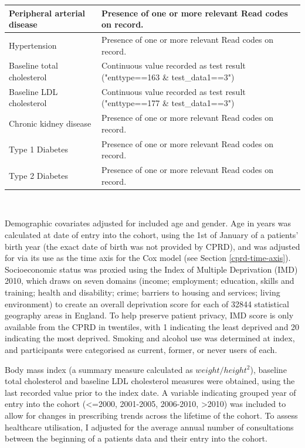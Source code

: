 \documentclass[a4paper, twoside]{templates/ociamthesis}
\begin{document}
\begin{table}[H]
\begin{tabular}[t]{>{\raggedright\arraybackslash}p{15em}>{\centering\arraybackslash}p{25em}}
\midrule
Peripheral arterial disease & Presence of one or more relevant Read codes on record.\\
\midrule
\addlinespace
Hypertension & Presence of one or more relevant Read codes on record.\\
\midrule
Baseline total cholesterol & Continuous value recorded as test result ("enttype==163 \& test\_data1==3")\\
\midrule
Baseline LDL cholesterol & Continuous value recorded as test result ("enttype==177 \& test\_data1==3")\\
\midrule
Chronic kidney disease & Presence of one or more relevant Read codes on record.\\
\midrule
Type 1 Diabetes & Presence of one or more relevant Read codes on record.\\
\midrule
\addlinespace
Type 2 Diabetes & Presence of one or more relevant Read codes on record.\\
\bottomrule
\end{tabular}
\end{table}

~

Demographic covariates adjusted for included age and gender. Age in years was calculated at date of entry into the cohort, using the 1st of January of a patients' birth year (the exact date of birth was not provided by CPRD), and was adjusted for via its use as the time axis for the Cox model (see Section \ref{cprd-time-axis}). Socioeconomic status was proxied using the Index of Multiple Deprivation (IMD) 2010, which draws on seven domains (income; employment; education, skills and training; health and disability; crime; barriers to housing and services; living environment) to create an overall deprivation score for each of 32844 statistical geography areas in England. To help preserve patient privacy, IMD score is only available from the CPRD in twentiles, with 1 indicating the least deprived and 20 indicating the most deprived. Smoking and alcohol use was determined at index, and participants were categorised as current, former, or never users of each.

Body mass index (a summary measure calculated as \(weight/height^2\)), baseline total cholesterol and baseline LDL cholesterol measures were obtained, using the last recorded value prior to the index date. A variable indicating grouped year of entry into the cohort (\textless=2000, 2001-2005, 2006-2010, \textgreater2010) was included to allow for changes in prescribing trends across the lifetime of the cohort. To assess healthcare utilisation, I adjusted for the average annual number of consultations between the beginning of a patients data and their entry into the cohort.
\end{document}
